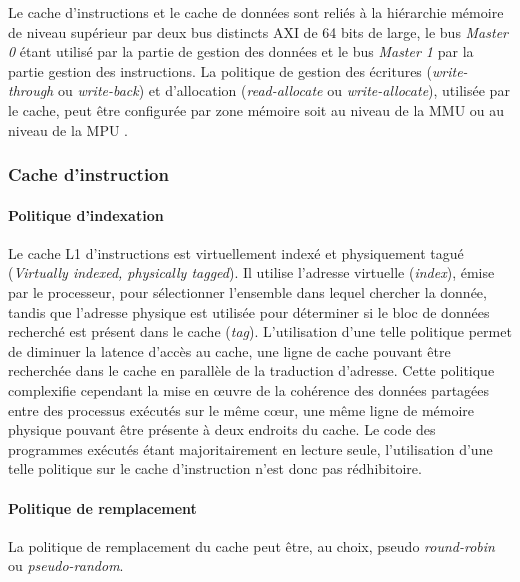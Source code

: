         Le cache d'instructions et le cache de données sont reliés à la hiérarchie mémoire de niveau supérieur par deux bus distincts AXI de 64 bits de large, le bus \emph{Master 0} étant utilisé par la partie de gestion des données et le bus \emph{Master 1} par la partie gestion des instructions.
        La politique de gestion des écritures (\emph{write-through} ou \emph{write-back}) et d'allocation (\emph{read-allocate} ou \emph{write-allocate}), utilisée par le cache, peut être configurée par zone mémoire soit au niveau de la MMU ou au niveau de la MPU \cite{manuel:cortex_a_series_programmer_s_guide}.

        \subsubsection{Cache d'instruction}

        \paragraph{Politique d'indexation} 
        Le cache L1 d'instructions est virtuellement indexé et physiquement tagué (\emph{Virtually indexed, physically tagged}). 
        Il utilise l'adresse virtuelle (\emph{index}), émise par le processeur, pour sélectionner l'ensemble dans lequel chercher la donnée, tandis que l'adresse physique est utilisée pour déterminer si le bloc de données recherché est présent dans le cache (\emph{tag}).
        L'utilisation d'une telle politique permet de diminuer la latence d'accès au cache, une ligne de cache pouvant être recherchée dans le cache en parallèle de la traduction d'adresse. Cette politique complexifie cependant la mise en œuvre de la cohérence des données partagées entre des processus exécutés sur le même cœur, une même ligne de mémoire physique pouvant être présente à deux endroits du cache.
        Le code des programmes exécutés étant majoritairement en lecture seule, l'utilisation d'une telle politique sur le cache d'instruction n'est donc pas rédhibitoire.
        \paragraph{Politique de remplacement} 
        La politique de remplacement du cache peut être, au choix, pseudo \emph{round-robin} ou \emph{pseudo-random}.
                        
